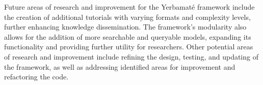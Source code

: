 Future areas of research and improvement for the Yerbamaté framework include the creation of additional tutorials with varying formats and complexity levels, further enhancing knowledge dissemination. The framework's modularity also allows for the addition of more searchable and queryable models, expanding its functionality and providing further utility for researchers. Other potential areas of research and improvement include refining the design, testing, and updating of the framework, as well as addressing identified areas for improvement and refactoring the code.%



